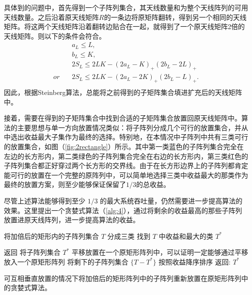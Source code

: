 具体到的问题中，首先得到一个子阵列集合，其天线数量和为整个天线阵列的可用天线数量。之后沿着原天线矩阵$R$的一条边将原矩阵翻转，得到另一个相同的天线矩阵。将这两个天线矩阵沿着翻转边贴合在一起，就得到了一个原天线矩阵2倍的天线矩阵。则以下的条件会符合。
\begin{equation}\label{eq:n6}
\begin{split}
&  a_L \leq L, \\
&  b_L \leq K, \\
&  2S_L \leq 2LK-(2a_L-K)_+(2b_L-2L)_+ \\
or\quad & 2S_L \leq 2LK-(2a_L-2K)_+(2b_L-L)_+ .\\
\end{split}
\end{equation}
因此，根据Steinberg算法，总能将之前得到的子矩阵集合填进扩充后的天线矩阵中。

接着，需要在得到的子矩阵集合中找到合适的子矩阵集合放置回原天线矩阵中。算法的主要思想与单一方向放置情况类似：将子阵列分成几个可行的放置集合，并从中选出收益最大子集作为最终的选择。特别地，在本情况中子阵列中共有三类可行的放置集合，如图（\ref{fig:2rectangle}）所示。其中第一类蓝色的子阵列集合完全在左边的长方形内，第二类绿色的子阵列集合完全在右边的长方形内，第三类红色的子阵列集合都正好穿过两个长方形的交界线。由于在长方形边界上的子阵列都肯定能可行的放置在一个完整的原阵列中，可以简单地选择三类中收益最大的那类作为最终的放置方案，则至少能够保证保留了$1/3$的总收益。

尽管上述算法能够得到至少 $1/3$ 的最大系统吞吐量，仍然需要进一步提高算法的效果。这里提出一个贪婪式算法（\ref{alg:4}），通过将剩余的收益最高的那些子阵列放置进原天线阵列，进一步提高算法的收益。

\begin{algorithm}
\SetAlgoLined
{}
将加倍后的矩形内的子阵列集合 $T$ 分成三类\;
找到 $T$ 中收益和最大的类 $T^*$  \;

 {返回}
{将子阵列集合 $T^*$ 平移放置在一个原矩形阵列中，可以证明一定能够通过平移放入一个原矩形阵列\;}
将剩下的子阵列集合 $\{T - T^*\}$ 按照收益降序排序 \;
返回: $T^*$
\caption{可互相垂直放置的情况下将加倍后的矩形阵列中的子阵列重新放置在原矩形阵列中的贪婪式算法。}\label{alg:4}
\end{algorithm}

